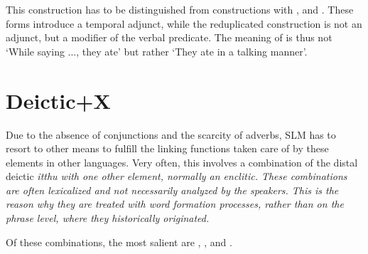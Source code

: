 This construction has to be distinguished from  constructions with ,  and . These forms introduce a temporal adjunct, while the reduplicated construction is not an adjunct, but a modifier of the verbal predicate. The meaning of  is thus not `While saying ..., they ate' but rather `They ate in a talking manner'.



% 

\section{Deictic+X}\label{sec:wofo:Deictic+X}
Due to the absence of conjunctions and the scarcity of adverbs, SLM has to resort to other means to fulfill the linking functions taken care of by these elements in other languages. Very often, this involves a combination of the distal deictic \em itthu \em with one other element, normally an enclitic. These combinations are often lexicalized and not necessarily analyzed by the speakers. This is the reason why they are treated with  word formation processes, rather than on the phrase level, where they historically originated.

Of these combinations, the most salient are , ,  and  .
 
